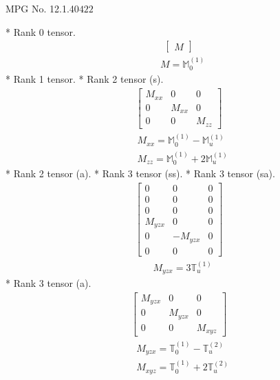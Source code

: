 \documentclass[fleqn,8pt,landscape]{jsarticle}
\begin{document}
\setcounter{MaxMatrixCols}{32}

\renewcommand{\tablename}{Table~}
\renewcommand{\figurename}{Figure~}
\begin{center}
\LARGE
MPG No. 12.1.40\quad$422$
\end{center}
* Rank 0 tensor.
\begin{align*}
\begin{bmatrix} M \end{bmatrix}
\end{align*}
\begin{align*}
& M = \mathbb{M}_{0}^{(1)}
\end{align*}
* Rank 1 tensor.
* Rank 2 tensor (s).
\begin{align*}
\begin{bmatrix} M_{xx} & 0 & 0 \\ 0 & M_{xx} & 0 \\ 0 & 0 & M_{zz} \end{bmatrix}
\end{align*}
\begin{align*}
& M_{xx} = \mathbb{M}_{0}^{(1)} - \mathbb{M}_{u}^{(1)} \\
& M_{zz} = \mathbb{M}_{0}^{(1)} + 2 \mathbb{M}_{u}^{(1)}
\end{align*}
* Rank 2 tensor (a).
* Rank 3 tensor (ss).
* Rank 3 tensor (sa).
\begin{align*}
\begin{bmatrix} 0 & 0 & 0 \\ 0 & 0 & 0 \\ 0 & 0 & 0 \\ M_{yzx} & 0 & 0 \\ 0 & - M_{yzx} & 0 \\ 0 & 0 & 0 \end{bmatrix}
\end{align*}
\begin{align*}
& M_{yzx} = 3 \mathbb{T}_{u}^{(1)}
\end{align*}
* Rank 3 tensor (a).
\begin{align*}
\begin{bmatrix} M_{yzx} & 0 & 0 \\ 0 & M_{yzx} & 0 \\ 0 & 0 & M_{xyz} \end{bmatrix}
\end{align*}
\begin{align*}
& M_{yzx} = \mathbb{T}_{0}^{(1)} - \mathbb{T}_{u}^{(2)} \\
& M_{xyz} = \mathbb{T}_{0}^{(1)} + 2 \mathbb{T}_{u}^{(2)}
\end{align*}
\end{document}
